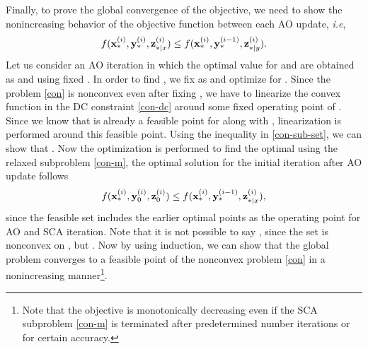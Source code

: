Finally, to prove the global convergence of the objective, we need to show the nonincreasing behavior of the objective function between each \ac{AO} update, \textit{i.e}, 
\begin{equation*}
f({\mathbf{x}}_{\ast}^{(i)},{\mathbf{y}}_{\ast}^{(i)},{\mathbf{z}}_{\ast|x}^{(i)}) \leq f({\mathbf{x}}_{\ast}^{(i)},{\mathbf{y}}_{\ast}^{(i-1)},{\mathbf{z}}_{\ast|y}^{(i)}).
\end{equation*}
Let us consider an \ac{AO} iteration  in which the optimal value for \eqn{\mx} and \eqn{\mz} are obtained as  and  using fixed . In order to find , we fix \eqn{\mx} as  and optimize for \me{\my}. Since the problem \eqref{con} is nonconvex even after fixing \me{\mx}, we have to linearize the convex function in the \ac{DC} constraint \eqref{con-dc} around some fixed operating point of \me{\my}. Since we know that  is already a feasible point for \me{\my} along with , linearization is performed around this feasible point. Using the inequality in \eqref{con-sub-set}, we can show that . Now the optimization is performed to find the optimal \me{\my} using the relaxed subproblem \eqref{con-m}, the optimal solution  for the initial iteration after \ac{AO} update follows
\begin{equation*}
f({\mathbf{x}}_{\ast}^{(i)},{\mathbf{y}}_{0}^{(i)},{\mathbf{z}}_{0}^{(i)}) \leq f({\mathbf{x}}_{\ast}^{(i)},{\mathbf{y}}_{\ast}^{(i-1)},{\mathbf{z}}_{\ast|x}^{(i)}),
\end{equation*}
since the feasible set includes the earlier optimal points  as the operating point for \ac{AO} and \ac{SCA} iteration. Note that it is not possible to say , since the set is nonconvex on \me{\mx,\my}, but . Now by using induction, we can show that the global problem converges to a feasible point of the nonconvex problem \eqref{con} in a nonincreasing manner\footnote{Note that the objective is monotonically decreasing even if the \ac{SCA} subproblem \eqref{con-m} is terminated after predetermined number iterations or for certain accuracy.}.

